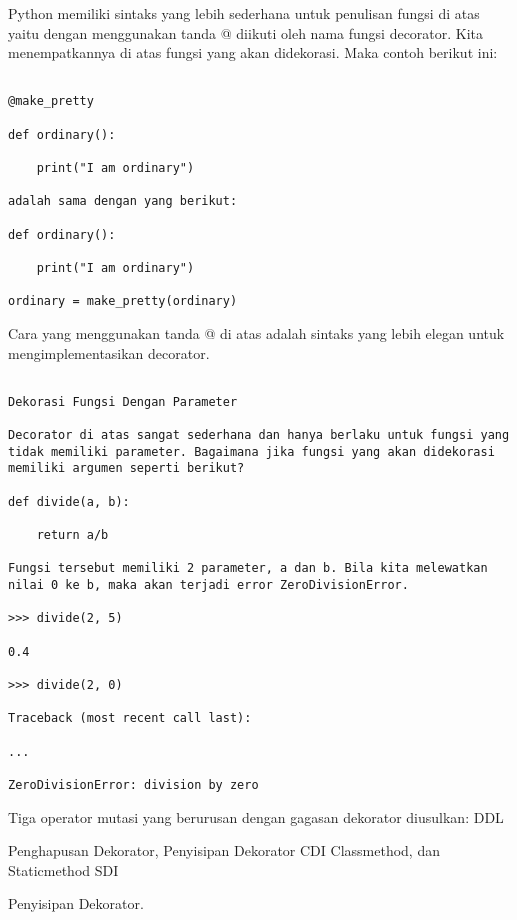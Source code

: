 \documentclass[12pt,a4paper]{article}
\begin{document}
Python memiliki sintaks yang lebih sederhana untuk penulisan fungsi di atas yaitu dengan menggunakan tanda  @ diikuti oleh nama fungsi decorator. Kita menempatkannya di atas fungsi yang akan didekorasi. Maka contoh berikut ini:



\begin{verbatim}

@make_pretty

def ordinary():

    print("I am ordinary")

adalah sama dengan yang berikut:

def ordinary():

    print("I am ordinary")

ordinary = make_pretty(ordinary)

\end{verbatim}

Cara yang menggunakan tanda @ di atas adalah sintaks yang lebih elegan untuk mengimplementasikan decorator.



\begin{verbatim}

Dekorasi Fungsi Dengan Parameter

Decorator di atas sangat sederhana dan hanya berlaku untuk fungsi yang tidak memiliki parameter. Bagaimana jika fungsi yang akan didekorasi memiliki argumen seperti berikut?

def divide(a, b):

    return a/b

Fungsi tersebut memiliki 2 parameter, a dan b. Bila kita melewatkan nilai 0 ke b, maka akan terjadi error ZeroDivisionError.

>>> divide(2, 5)

0.4

>>> divide(2, 0)

Traceback (most recent call last):

...

ZeroDivisionError: division by zero

\end{verbatim}



Tiga operator mutasi yang berurusan dengan gagasan dekorator diusulkan: DDL

Penghapusan Dekorator, Penyisipan Dekorator CDI Classmethod, dan Staticmethod SDI

Penyisipan Dekorator.
\end{document}
